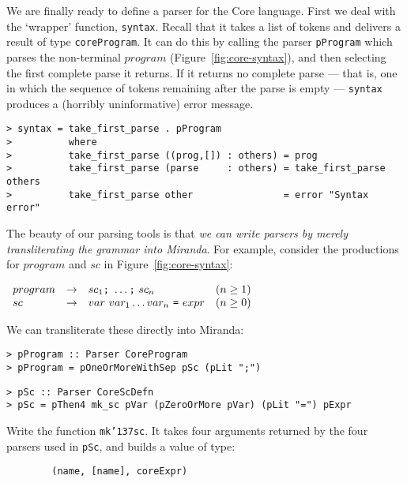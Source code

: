We are finally ready to define a parser for the Core language.
First we deal with the `wrapper' function, \mbox{\tt syntax}.  Recall that
it takes a list of tokens and delivers a result of type \mbox{\tt coreProgram}.
It can do this by calling the parser \mbox{\tt pProgram} which parses the
non-terminal $program$ (Figure~\ref{fig:core-syntax}),
and then selecting the first complete parse it returns.
If it returns no complete parse --- that is, one in which
the sequence of tokens remaining after the parse is empty ---
\mbox{\tt syntax} produces a (horribly uninformative) error message.
\begin{verbatim}
> syntax = take_first_parse . pProgram
>          where
>          take_first_parse ((prog,[]) : others) = prog
>          take_first_parse (parse     : others) = take_first_parse others
>          take_first_parse other                = error "Syntax error"
\end{verbatim}
%
\par
The beauty of our parsing tools is that {\em we can write
parsers by merely transliterating the
grammar into Miranda}.  For example, consider the productions for $program$
and $sc$ in
Figure~\ref{fig:core-syntax}:
\begin{center}
$\begin{array}{lcll}
program & \rightarrow & sc_1 \mbox{\tt ;}~\ldots \mbox{\tt ;}~sc_n & (n \geq 1) \\
sc & \rightarrow & var ~ var_1 \ldots var_n ~\mbox{\tt =}~ expr &(n\geq 0)
\end{array}$
\end{center}
We can transliterate these directly into Miranda:
\begin{verbatim}
> pProgram :: Parser CoreProgram
> pProgram = pOneOrMoreWithSep pSc (pLit ";")
\end{verbatim}
%
%
\begin{verbatim}
> pSc :: Parser CoreScDefn
> pSc = pThen4 mk_sc pVar (pZeroOrMore pVar) (pLit "=") pExpr
\end{verbatim}
%
%
\begin{exercise}
Write the function \mbox{\tt mk{\char'137}sc}.  It takes four arguments returned by the
four parsers used in \mbox{\tt pSc}, and builds a value of type:
\begin{verbatim}
        (name, [name], coreExpr)
\end{verbatim}
\end{exercise}

